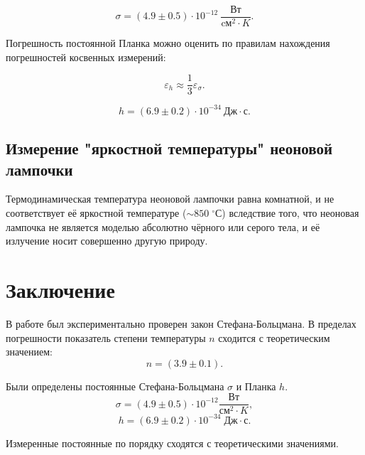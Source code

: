 \documentclass[a4paper, 12pt]{article}
\newcommand{\cels}{\; ^\circ С}
\begin{document}
    $$ \sigma = (4.9 \pm 0.5) \cdot 10^{-12} \: \frac{\text{Вт}}{\text{cм}^2 \cdot K}.$$
	
    Погрешность постоянной Планка можно оценить по правилам нахождения погрешностей косвенных измерений:
	
    $$\varepsilon_h \approx \frac{1}{3} \varepsilon_\sigma.$$

    $$ h = (6.9 \pm 0.2) \cdot 10^{-34} \: \text{Дж} \cdot \text{с}.$$

    \subsection{Измерение "яркостной температуры" неоновой лампочки}

    Термодинамическая температура неоновой лампочки равна комнатной, и не соответствует её яркостной температуре ($\sim 850 \cels$) вследствие того, что неоновая лампочка не является моделью абсолютно чёрного или серого тела, и её излучение носит совершенно другую природу.

    \section{Заключение}
    
    В работе был экспериментально проверен закон Стефана-Больцмана. В пределах погрешности показатель степени температуры $n$ сходится с теоретическим значением:
    $$
    n = (3.9 \pm 0.1).
    $$

    Были определены постоянные Стефана-Больцмана $\sigma$ и Планка $h$. 
    $$
    \sigma = (4.9 \pm 0.5) \cdot 10^{-12} \frac{\text{Вт}}{\text{см}^2 \cdot K},$$ 
    $$h = (6.9 \pm 0.2) \cdot 10^{-34}\; \text{Дж} \cdot \text{с}.$$

    Измеренные постоянные по порядку сходятся с теоретическими значениями.
    
\end{document}
